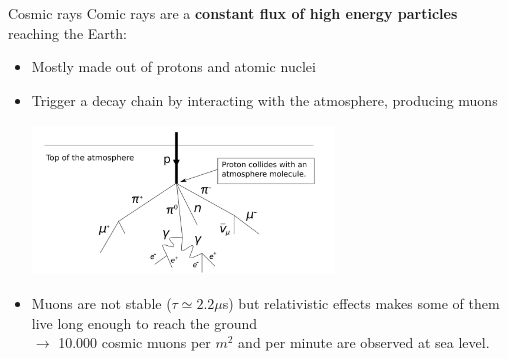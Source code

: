 \documentclass[8 pt]{beamer}
\begin{document}
\begin{frame}{Cosmic rays}
\justifying
Comic rays are a \textbf{constant flux of high energy particles} reaching the Earth:
\begin{itemize}
	\justifying
	\item Mostly made out of protons and atomic nuclei
	\item Trigger a decay chain by interacting with the atmosphere, producing muons

	\begin{minipage}[c]{.98\textwidth}
	\begin{center}
	\includegraphics[width=8cm, height=4cm]{figs/cosmic.png}
	\end{center}
\end{minipage} \hfill 
	
	\item Muons are not stable ($\tau \simeq 2.2\mu$s) but relativistic effects makes some of them live long enough to reach the ground \\ \hspace{10pt} $\rightarrow$ 10.000 cosmic muons per $m^2$ and per minute are observed at sea level.
\end{itemize} \vfill

\end{frame}
\end{document}
